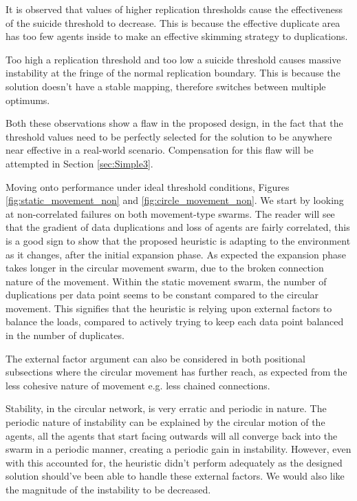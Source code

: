 \documentclass{UoYCSproject}
\begin{document}
It is observed that values of higher replication thresholds cause the effectiveness of the suicide threshold to decrease.
This is because the effective duplicate area has too few agents inside to make an effective skimming strategy to duplications.

Too high a replication threshold and too low a suicide threshold causes massive instability at the fringe of the normal replication boundary.
This is because the solution doesn’t have a stable mapping, therefore switches between multiple optimums.

Both these observations show a flaw in the proposed design, in the fact that the threshold values need to be perfectly selected for the solution to be anywhere near effective in a real-world scenario.
Compensation for this flaw will be attempted in Section \ref{sec:Simple3}.

Moving onto performance under ideal threshold conditions, Figures \ref{fig:static_movement_non} and \ref{fig:circle_movement_non}.
We start by looking at non-correlated failures on both movement-type swarms.
The reader will see that the gradient of data duplications and loss of agents are fairly correlated, this is a good sign to show that the proposed heuristic is adapting to the environment as it changes, after the initial expansion phase.
As expected the expansion phase takes longer in the circular movement swarm, due to the broken connection nature of the movement.
Within the static movement swarm, the number of duplications per data point seems to be constant compared to the circular movement.
This signifies that the heuristic is relying upon external factors to balance the loads, compared to actively trying to keep each data point balanced in the number of duplicates.

The external factor argument can also be considered in both positional subsections where the circular movement has further reach, as expected from the less cohesive nature of movement e.g. less chained connections.

Stability, in the circular network, is very erratic and periodic in nature.
The periodic nature of instability can be explained by the circular motion of the agents, all the agents that start facing outwards will all converge back into the swarm in a periodic manner, creating a periodic gain in instability.
However, even with this accounted for, the heuristic didn’t perform adequately as the designed solution should’ve been able to handle these external factors.
We would also like the magnitude of the instability to be decreased.
\end{document}
